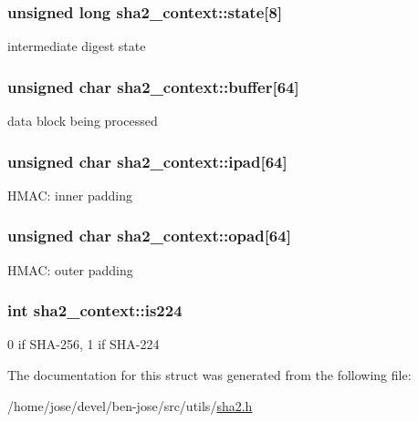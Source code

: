 \subsubsection[{\texorpdfstring{state}{state}}]{\setlength{\rightskip}{0pt plus 5cm}unsigned long sha2\+\_\+context\+::state\mbox{[}8\mbox{]}}\hypertarget{structsha2__context_a61a62a66ac1851bcd90aa65e7fad1328}{}\label{structsha2__context_a61a62a66ac1851bcd90aa65e7fad1328}
intermediate digest state 
\subsubsection[{\texorpdfstring{buffer}{buffer}}]{\setlength{\rightskip}{0pt plus 5cm}unsigned char sha2\+\_\+context\+::buffer\mbox{[}64\mbox{]}}\hypertarget{structsha2__context_aa5c93c2e2e8fc23008a849ea4f9a0b91}{}\label{structsha2__context_aa5c93c2e2e8fc23008a849ea4f9a0b91}
data block being processed 
\subsubsection[{\texorpdfstring{ipad}{ipad}}]{\setlength{\rightskip}{0pt plus 5cm}unsigned char sha2\+\_\+context\+::ipad\mbox{[}64\mbox{]}}\hypertarget{structsha2__context_a4b003f9de8a8d823d19e813311764bd2}{}\label{structsha2__context_a4b003f9de8a8d823d19e813311764bd2}
H\+M\+AC\+: inner padding 
\subsubsection[{\texorpdfstring{opad}{opad}}]{\setlength{\rightskip}{0pt plus 5cm}unsigned char sha2\+\_\+context\+::opad\mbox{[}64\mbox{]}}\hypertarget{structsha2__context_a3f710fbbb4c2c1ce3d57de40b1036cea}{}\label{structsha2__context_a3f710fbbb4c2c1ce3d57de40b1036cea}
H\+M\+AC\+: outer padding 
\subsubsection[{\texorpdfstring{is224}{is224}}]{\setlength{\rightskip}{0pt plus 5cm}int sha2\+\_\+context\+::is224}\hypertarget{structsha2__context_a20fd61f8c14d811e93b7186ca71ecfbd}{}\label{structsha2__context_a20fd61f8c14d811e93b7186ca71ecfbd}
0 if S\+H\+A-\/256, 1 if S\+H\+A-\/224 

The documentation for this struct was generated from the following file\+:\begin{DoxyCompactItemize}
\item 
/home/jose/devel/ben-\/jose/src/utils/\hyperlink{sha2_8h}{sha2.\+h}\end{DoxyCompactItemize}
